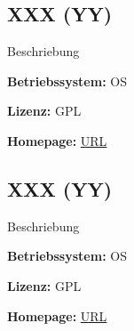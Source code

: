 \documentclass[12pt,a4paper,landscape,twocolumn]{article}
\newcommand{\software}[6]{
\subsection*{#1 (#2)}
\begin{compactitem}
\item #3
\item \textbf{Betriebssystem:} #4
\item \textbf{Lizenz:} #6
\item \textbf{Homepage:} \url{#5}
\end{compactitem} 
}
\begin{document}


\software{XXX}{YY}
{Beschriebung}
{OS}
{URL}
{GPL}


\newpage %


\software{XXX}{YY}
{Beschriebung}
{OS}
{URL}
{GPL}
\end{document}
